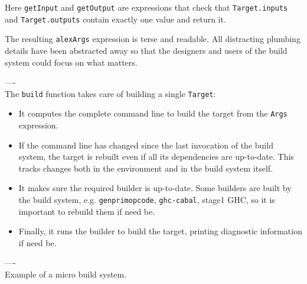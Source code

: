 Here \texttt{getInput} and \texttt{getOutput} are expressions that check that
\texttt{Target.inputs} and \texttt{Target.outputs} contain exactly one value and
return it.

The resulting \texttt{alexArgs} expression is terse and readable. All
distracting plumbing details have been abstracted away so that the
designers and users of the build system could focus on what matters.

\noindent ----\\
\noindent The \texttt{build} function takes care of building a single
\texttt{Target}:
\begin{itemize}
  \item It computes the complete command line to build the target from the
  \texttt{Args} expression.
  \item If the command line has changed since the last invocation of the build
  system, the target is rebuilt even if all its dependencies are up-to-date.
  This tracks changes both in the environment and in the build system itself.
  \item It makes sure the required builder is up-to-date. Some builders are
  built by the build system, e.g. \texttt{genprimopcode}, \texttt{ghc-cabal},
  stage1 GHC, so it is important to rebuild them if need be.
  \item Finally, it runs the builder to build the target, printing diagnostic
  information if need be.
\end{itemize}

\noindent ----\\
\noindent Example of a micro build system.

\newcommand{\tabx}[1]{\hspace{.106\textwidth}\rlap{#1}}
\newcommand{\taby}[1]{\hspace{.103\textwidth}\rlap{#1}}
\newcommand{\tabz}[1]{\hspace{.24\textwidth}\rlap{#1}}

